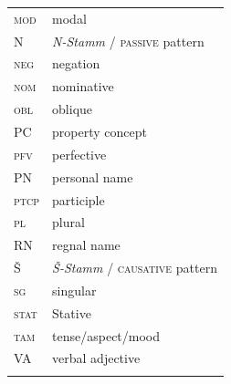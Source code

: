 \documentclass[output=paper,colorlinks,citecolor=brown]{langscibook}
\begin{document}
\begin{tabularx}{.47\textwidth}{lQ}
   \textsc{mod} & modal \\
     N & \emph{N-Stamm} / \textsc{passive} pattern \\
     \textsc{neg} & negation \\
   \textsc{nom} & nominative \\
  \textsc{obl} & oblique \\
     PC & property concept \\
     \textsc{pfv} & perfective \\
   PN & personal name \\
     \textsc{ptcp} & participle \\
     \textsc{pl} & plural \\
     RN & regnal name \\
    Š & \emph{Š-Stamm} / \textsc{causative} pattern \\
    \textsc{sg} & singular \\
     \textsc{stat} & Stative \\
    \textsc{tam} & tense/aspect/mood \\
    VA & verbal adjective \\
    \\
\end{tabularx}



{\sloppy\printbibliography[heading=subbibliography,notkeyword=this]}
\end{document}
